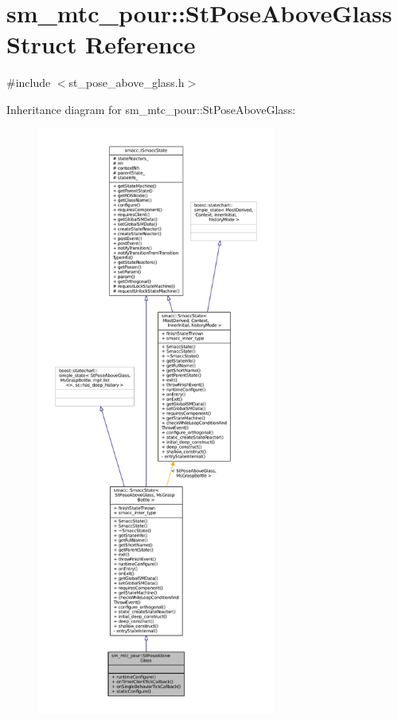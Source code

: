 \hypertarget{structsm__mtc__pour_1_1StPoseAboveGlass}{}\section{sm\+\_\+mtc\+\_\+pour\+:\+:St\+Pose\+Above\+Glass Struct Reference}
\label{structsm__mtc__pour_1_1StPoseAboveGlass}


{\ttfamily \#include $<$st\+\_\+pose\+\_\+above\+\_\+glass.\+h$>$}



Inheritance diagram for sm\+\_\+mtc\+\_\+pour\+:\+:St\+Pose\+Above\+Glass\+:
\nopagebreak
\begin{figure}[H]
\begin{center}
\leavevmode
\includegraphics[height=550pt]{structsm__mtc__pour_1_1StPoseAboveGlass__inherit__graph}
\end{center}
\end{figure}


